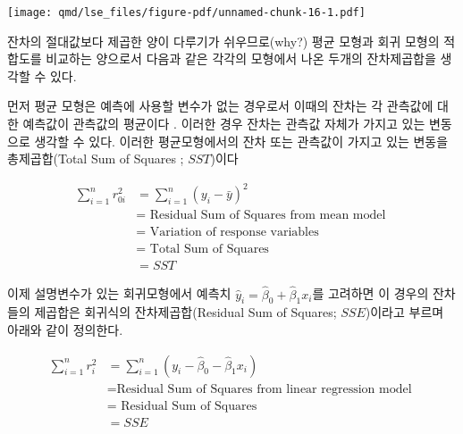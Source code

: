 \documentclass[
  11pt,
  a4paper,
  oneside]{scrbook}
\newenvironment{Shaded}{\begin{snugshade}}{\end{snugshade}}
\newcommand{\AttributeTok}[1]{\textcolor[rgb]{0.40,0.45,0.13}{#1}}
\newcommand{\ConstantTok}[1]{\textcolor[rgb]{0.56,0.35,0.01}{#1}}
\newcommand{\FunctionTok}[1]{\textcolor[rgb]{0.28,0.35,0.67}{#1}}
\newcommand{\NormalTok}[1]{\textcolor[rgb]{0.00,0.23,0.31}{#1}}
\newcommand{\SpecialCharTok}[1]{\textcolor[rgb]{0.37,0.37,0.37}{#1}}
\newcommand{\StringTok}[1]{\textcolor[rgb]{0.13,0.47,0.30}{#1}}
\theoremstyle{definition}
\theoremstyle{plain}
\theoremstyle{definition}
\theoremstyle{definition}
\theoremstyle{remark}
\begin{document}
\begin{Shaded}
\end{Shaded}

\texttt{[image: qmd/lse\_files/figure-pdf/unnamed-chunk-16-1.pdf]}

잔차의 절대값보다 제곱한 양이 다루기가 쉬우므로(why?) 평균 모형과 회귀
모형의 적합도를 비교하는 양으로서 다음과 같은 각각의 모형에서 나온
두개의 잔차제곱합을 생각할 수 있다.

먼저 평균 모형은 예측에 사용할 변수가 없는 경우로서 이때의 잔차는 각
관측값에 대한 예측값이 관측값의 평균이다 . 이러한 경우 잔차는 관측값
자체가 가지고 있는 변동으로 생각할 수 있다. 이러한 평균모형에서의 잔차
또는 관측값이 가지고 있는 변동을 총제곱합(Total Sum of Squares ;
\(SST\))이다

\[
\begin{align}
\sum_{i=1}^n r^2_{0i} & = \sum_{i=1}^n (y_i -\bar y)^2 \\
  & =  \text{ Residual Sum of Squares from mean model }  \\
   & = \text{ Variation of response variables} \\
   & = \text{ Total Sum of Squares } \\
   & = SST
\end{align}
\]

이제 설명변수가 있는 회귀모형에서 예측치
\(\hat y_i=\hat \beta_0 + \hat \beta_1 x_i\)를 고려하면 이 경우의
잔차들의 제곱합은 회귀식의 잔차제곱합(Residual Sum of Squares;
\(SSE\))이라고 부르며 아래와 같이 정의한다.

\[
\begin{align}
\sum_{i=1}^n r_i^2 & = \sum_{i=1}^n (y_i -\hat \beta_0 - \hat \beta_1 x_i) \\
  & = \text{Residual Sum of Squares from linear regression model } \\
  & = \text{ Residual Sum of Squares } \\
  & = SSE 
\end{align}
\]
\end{document}
